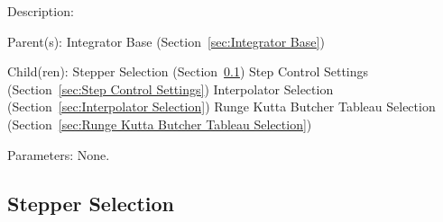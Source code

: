 \begin{list}{}
  {\setlength{\leftmargin}{1.0in}
   \setlength{\labelwidth}{0.75in}
   \setlength{\labelsep}{0.125in}}
  \item[Description:]
  \item[Parent(s):]
    Integrator Base (Section~\ref{sec:Integrator Base})
  \item[Child(ren):]
    Stepper Selection (Section~\ref{sec:Stepper Selection})
      \newline 
    Step Control Settings (Section~\ref{sec:Step Control Settings})
      \newline 
    Interpolator Selection (Section~\ref{sec:Interpolator Selection})
      \newline 
    Runge Kutta Butcher Tableau Selection (Section~\ref{sec:Runge Kutta Butcher Tableau Selection})
  \item[Parameters:]
    None. 
\end{list}

\subsection{Stepper Selection}
\label{sec:Stepper Selection}

